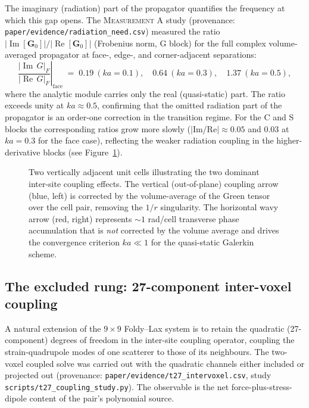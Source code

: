 \documentclass[11pt,a4paper]{article}
\theoremstyle{plain}
\theoremstyle{definition}
\theoremstyle{remark}
\begin{document}
The imaginary (radiation) part of the propagator quantifies the frequency
at which this gap opens.  The \textsc{Measurement A} study (provenance:
\texttt{paper/evidence/radiation\_need.csv}) measured the ratio
$|\operatorname{Im}[\mathbf{G}_0]|/|\operatorname{Re}[\mathbf{G}_0]|$
(Frobenius norm, G block) for the full complex volume-averaged propagator
at face-, edge-, and corner-adjacent separations:
\begin{equation}
  \left.\frac{|\operatorname{Im}\,G|_F}{|\operatorname{Re}\,G|_F}\right|_{\text{face}}
  \;=\; 0.19\ (ka=0.1),\quad 0.64\ (ka=0.3),\quad 1.37\ (ka=0.5),
  \label{eq:imre-ratio}
\end{equation}
where the analytic module carries only the real (quasi-static) part.
The ratio exceeds unity at $ka \approx 0.5$, confirming that the
omitted radiation part of the propagator is an order-one correction in
the transition regime.  For the C and S blocks the corresponding ratios
grow more slowly ($|$Im/Re$| \approx 0.05$ and $0.03$ at $ka = 0.3$
for the face case), reflecting the weaker radiation coupling in the
higher-derivative blocks (see Figure~\ref{fig:intersite-phase}).

\begin{figure}[h]
\centering

\caption{%
  Two vertically adjacent unit cells illustrating the two dominant
  inter-site coupling effects.  The vertical (out-of-plane) coupling arrow
  (blue, left) is corrected by the volume-average of the Green tensor over
  the cell pair, removing the $1/r$ singularity.  The horizontal wavy arrow
  (red, right) represents $\sim\!1$ rad/cell transverse phase accumulation
  that is \emph{not} corrected by the volume average and drives the
  convergence criterion $ka \ll 1$ for the quasi-static Galerkin scheme.%
}
\label{fig:intersite-phase}
\end{figure}

\subsection{The excluded rung: 27-component inter-voxel coupling}
\label{sec:inter-t27-excluded}

A natural extension of the $9\times9$ Foldy--Lax system is to retain
the quadratic (27-component) degrees of freedom in the inter-site
coupling operator, coupling the strain-quadrupole modes of one scatterer
to those of its neighbours.  The two-voxel coupled solve was carried out
with the quadratic channels either included or projected out (provenance:
\texttt{paper/evidence/t27\_intervoxel.csv}, study
\texttt{scripts/t27\_coupling\_study.py}).  The observable is the net
force-plus-stress-dipole content of the pair's polynomial source.
\end{document}
